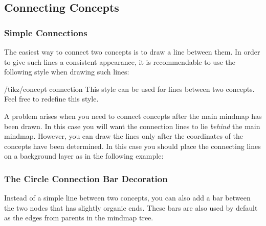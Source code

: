 \subsection{Connecting Concepts}

\subsubsection{Simple Connections}

The easiest way to connect two concepts is to draw a line between
them. In order to give such lines a consistent appearance, it is
recommendable to use the following style when drawing such lines:

\begin{stylekey}{/tikz/concept connection}
  This style can be used for lines between two concepts. Feel free to
  redefine this style.
\end{stylekey}

A problem arises when you need to connect concepts after the main
mindmap has been drawn. In this case you will want the connection
lines to lie \emph{behind} the main mindmap. However, you can draw the
lines only after the coordinates of the concepts have been
determined. In this case you should place the connecting lines on a
background layer as in the following example:

\begin{codeexample}[]
\end{codeexample}


\subsubsection{The Circle Connection Bar Decoration}

Instead of a simple line between two concepts, you can also add a bar
between the two nodes that has slightly organic ends. These bars are
also used by default as the edges from parents in the mindmap tree.


